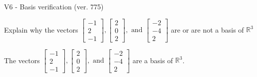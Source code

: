 \begin{exercise}
  \begin{exerciseTitle}V6 - Basis verification (ver. 775)\end{exerciseTitle}
  \begin{exerciseStatement}
    Explain why the vectors \(\left[\begin{array}{r}
-1 \\
2 \\
-1
\end{array}\right] , \left[\begin{array}{r}
2 \\
0 \\
2
\end{array}\right] , \text{ and } \left[\begin{array}{r}
-2 \\
-4 \\
2
\end{array}\right]\) are or are not a basis of \(\mathbb{R}^3\)	


  \end{exerciseStatement}
  \begin{exerciseAnswer}
   The vectors \(\left[\begin{array}{r}
-1 \\
2 \\
-1
\end{array}\right] , \left[\begin{array}{r}
2 \\
0 \\
2
\end{array}\right] , \text{ and } \left[\begin{array}{r}
-2 \\
-4 \\
2
\end{array}\right]\) 
  	 are  a basis of \(\mathbb{R}^3\).
  


  \end{exerciseAnswer}
\end{exercise}